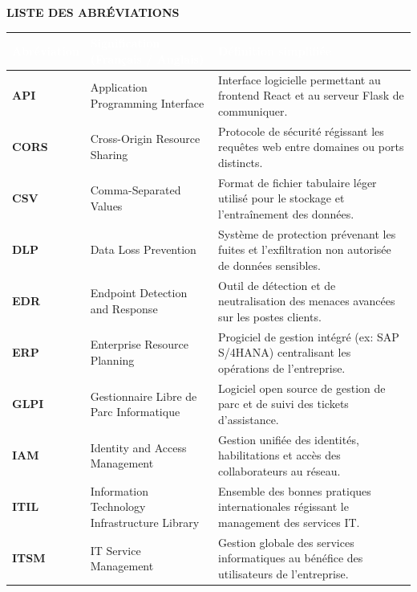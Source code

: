 \documentclass[12pt, a4paper, oneside]{report}
\begin{document}
\newpage
{}
\begin{flushright}
  \textbf{\Large LISTE DES ABRÉVIATIONS}
\end{flushright}

\vspace{0.6cm}

\begin{longtable}{|p{2.4cm}|p{5.4cm}|p{7.4cm}|}
\hline
\rowcolor{themeDark}
\textcolor{white}{\textbf{Abréviation}} &
\textcolor{white}{\textbf{Signification (Français / Anglais)}} &
\textcolor{white}{\textbf{Définition simplifiée}} \\
\hline
\endhead

\textbf{API} & Application Programming Interface & Interface logicielle permettant au frontend React et au serveur Flask de communiquer. \\
\hline
\textbf{CORS} & Cross-Origin Resource Sharing & Protocole de sécurité régissant les requêtes web entre domaines ou ports distincts. \\
\hline
\textbf{CSV} & Comma-Separated Values & Format de fichier tabulaire léger utilisé pour le stockage et l'entraînement des données. \\
\hline
\textbf{DLP} & Data Loss Prevention & Système de protection prévenant les fuites et l'exfiltration non autorisée de données sensibles. \\
\hline
\textbf{EDR} & Endpoint Detection and Response & Outil de détection et de neutralisation des menaces avancées sur les postes clients. \\
\hline
\textbf{ERP} & Enterprise Resource Planning & Progiciel de gestion intégré (ex: SAP S/4HANA) centralisant les opérations de l'entreprise. \\
\hline
\textbf{GLPI} & Gestionnaire Libre de Parc Informatique & Logiciel open source de gestion de parc et de suivi des tickets d'assistance. \\
\hline
\textbf{IAM} & Identity and Access Management & Gestion unifiée des identités, habilitations et accès des collaborateurs au réseau. \\
\hline
\textbf{ITIL} & Information Technology Infrastructure Library & Ensemble des bonnes pratiques internationales régissant le management des services IT. \\
\hline
\textbf{ITSM} & IT Service Management & Gestion globale des services informatiques au bénéfice des utilisateurs de l'entreprise. \\

\end{longtable}
\end{document}
